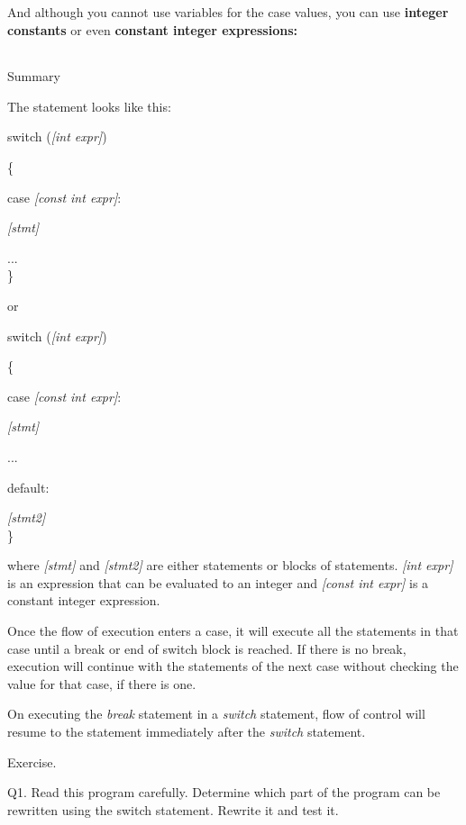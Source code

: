 \documentclass[
]{article}
\begin{document}
\begin{longtable}[]{@{}@{}}
\toprule
\endhead
\bottomrule
\end{longtable}

And although you cannot use variables for the case values, you can use
\textbf{integer constants} or even \textbf{constant integer
expressions:}

\begin{longtable}[]{@{}@{}}
\toprule
\endhead
\bottomrule
\end{longtable}

Summary

The statement looks like this:

switch (\emph{{[}int expr{]}})

\{

case \emph{{[}const int expr{]}}:

\emph{ {[}stmt{]}}

...\\
\}

or

switch (\emph{{[}int expr{]}})

\{

case \emph{{[}const int expr{]}}:

\emph{ {[}stmt{]}}

...

default:

\emph{ {[}stmt2{]}}\\
\}

where \emph{{[}stmt{]}} and \emph{{[}stmt2{]}} are either statements or
blocks of statements. \emph{{[}int expr{]}} is an expression that can be
evaluated to an integer and \emph{{[}const int expr{]}} is a constant
integer expression.

Once the flow of execution enters a case, it will execute all the
statements in that case until a break or end of switch block is reached.
If there is no break, execution will continue with the statements of the
next case without checking the value for that case, if there is one.

On executing the \emph{break} statement in a \emph{switch} statement,
flow of control will resume to the statement immediately after the
\emph{switch} statement.

Exercise.

Q1. Read this program carefully. Determine which part of the program can
be rewritten using the switch statement. Rewrite it and test it.
\end{document}
